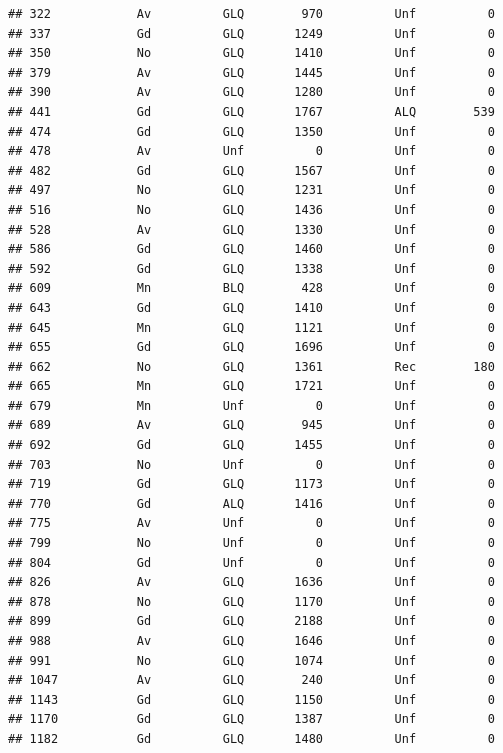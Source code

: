 \documentclass[]{article}
\begin{document}
\begin{verbatim}
## 322            Av          GLQ        970          Unf          0
## 337            Gd          GLQ       1249          Unf          0
## 350            No          GLQ       1410          Unf          0
## 379            Av          GLQ       1445          Unf          0
## 390            Av          GLQ       1280          Unf          0
## 441            Gd          GLQ       1767          ALQ        539
## 474            Gd          GLQ       1350          Unf          0
## 478            Av          Unf          0          Unf          0
## 482            Gd          GLQ       1567          Unf          0
## 497            No          GLQ       1231          Unf          0
## 516            No          GLQ       1436          Unf          0
## 528            Av          GLQ       1330          Unf          0
## 586            Gd          GLQ       1460          Unf          0
## 592            Gd          GLQ       1338          Unf          0
## 609            Mn          BLQ        428          Unf          0
## 643            Gd          GLQ       1410          Unf          0
## 645            Mn          GLQ       1121          Unf          0
## 655            Gd          GLQ       1696          Unf          0
## 662            No          GLQ       1361          Rec        180
## 665            Mn          GLQ       1721          Unf          0
## 679            Mn          Unf          0          Unf          0
## 689            Av          GLQ        945          Unf          0
## 692            Gd          GLQ       1455          Unf          0
## 703            No          Unf          0          Unf          0
## 719            Gd          GLQ       1173          Unf          0
## 770            Gd          ALQ       1416          Unf          0
## 775            Av          Unf          0          Unf          0
## 799            No          Unf          0          Unf          0
## 804            Gd          Unf          0          Unf          0
## 826            Av          GLQ       1636          Unf          0
## 878            No          GLQ       1170          Unf          0
## 899            Gd          GLQ       2188          Unf          0
## 988            Av          GLQ       1646          Unf          0
## 991            No          GLQ       1074          Unf          0
## 1047           Av          GLQ        240          Unf          0
## 1143           Gd          GLQ       1150          Unf          0
## 1170           Gd          GLQ       1387          Unf          0
## 1182           Gd          GLQ       1480          Unf          0

\end{verbatim}
\end{document}
